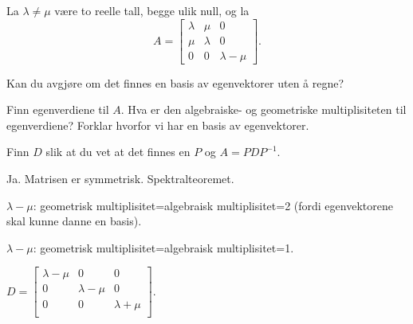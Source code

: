 \begin{oppgave}

La $\lambda\neq \mu$ være to reelle tall, begge ulik null, og la
$$A=
\begin{bmatrix}
\lambda & \mu & 0\\
\mu & \lambda & 0\\
0 & 0 & \lambda-\mu
\end{bmatrix}.$$
\begin{punkt}
Kan du avgjøre om det finnes en basis av egenvektorer uten å regne?
\end{punkt}
\begin{punkt}
Finn egenverdiene til $A$. Hva er den algebraiske- og geometriske multiplisiteten til egenverdiene? Forklar hvorfor vi har en basis av egenvektorer.
\end{punkt}
\begin{punkt}
Finn $D$ slik at du vet at det finnes en $P$ og $A=PDP^{-1}$.
\end{punkt}
\end{oppgave}

\begin{losning}


\begin{punkt}
Ja. Matrisen er symmetrisk. Spektralteoremet.
\end{punkt}

\begin{punkt}
$\lambda-\mu$: geometrisk multiplisitet=algebraisk multiplisitet=2 (fordi egenvektorene skal kunne danne en basis).

\noindent
$\lambda-\mu$: geometrisk multiplisitet=algebraisk multiplisitet=1.

\end{punkt}

$D=\begin{bmatrix}
\lambda-\mu & 0 & 0\\
0 & \lambda-\mu & 0\\
0 & 0 & \lambda+\mu\\
\end{bmatrix}.$


\end{losning}


